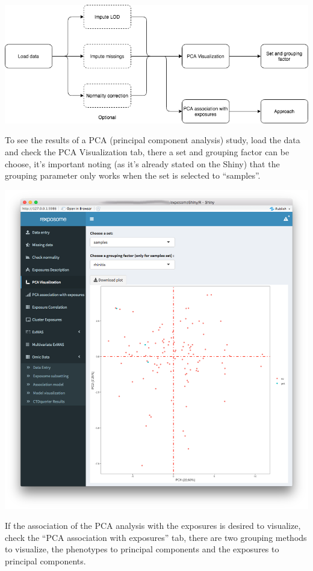 \documentclass[
]{book}
\begin{document}
\includegraphics{images/analysis5_1.png}

To see the results of a PCA (principal component analysis) study, load the data and check the PCA Visualization tab, there a set and grouping factor can be choose, it's important noting (as it's already stated on the Shiny) that the grouping parameter only works when the set is selected to ``samples''.

\includegraphics{images/analysis5_2.png}

If the association of the PCA analysis with the exposures is desired to visualize, check the ``PCA association with exposures'' tab, there are two grouping methods to visualize, the phenotypes to principal components and the exposures to principal components.
\end{document}
